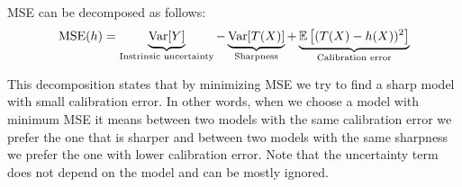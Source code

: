 MSE can be decomposed as follows:
\begin{align}
	\label{eqn:mse-decomposiiton}
	\text {MSE}(h) = \underbrace{\text {Var}[Y]}_{\text {Instrinsic uncertainty}} - \underbrace{\text {Var} [T(X)]}_\text{Sharpness} + \underbrace{\mathbb{E} \left [(T(X) - h(X))^2\right]}_\text{Calibration error}
\end{align}

This decomposition states that by minimizing MSE we try to find a sharp model with small calibration error.
In other words, when we choose a model with minimum MSE it means between two models with the same calibration error we prefer the one that is sharper and between two models with the same sharpness we prefer the one with lower calibration error.
Note that the uncertainty term does not depend on the model and can be mostly ignored.



